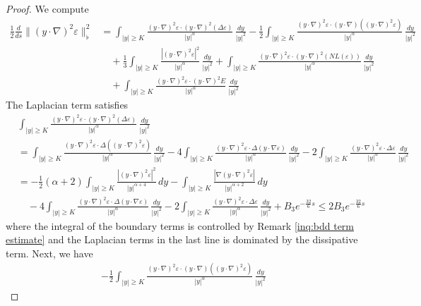 \documentclass[11pt,reqno]{amsart}
\theoremstyle{definition}
\theoremstyle{bfremark}
\numberwithin{equation}{section}
\begin{document}
\begin{proof}
We compute
\begin{align*}
    \frac{1}{2} \frac{d}{ds} \|(y \cdot \nabla)^2 \varepsilon\|_{\flat}^2 
    &= \int_{|y| \geq K} \frac{(y \cdot \nabla)^2 \varepsilon \cdot (y \cdot \nabla)^2(\Delta \varepsilon)}{|y|^{\alpha}}\, \frac{dy}{|y|^2}
    - \frac{1}{2} \int_{|y| \geq K} \frac{(y \cdot \nabla)^2 \varepsilon \cdot (y \cdot \nabla)((y \cdot \nabla)^2\varepsilon)}{|y|^{\alpha}}\,\frac{dy}{|y|^2} \\
    &\quad + \frac{1}{3} \int_{|y| \geq K} \frac{|(y \cdot \nabla)^2\varepsilon|^2}{|y|^{\alpha}}\,\frac{dy}{|y|^2}+ \int_{|y| \geq K} \frac{(y \cdot \nabla)^2 \varepsilon \cdot (y \cdot \nabla)^2 (NL(\varepsilon))}{|y|^{\alpha}}\,\frac{dy}{|y|^2}\\
    & \quad +\int_{|y| \geq K}\frac{(y \cdot \nabla)^2 \varepsilon \cdot (y \cdot \nabla)^2 E}{|y|^{\alpha}}\,\frac{dy}{|y|^2}
\end{align*}
The Laplacian term satisfies
\begin{align*}
    &\int_{|y| \geq K} \frac{(y \cdot \nabla)^2 \varepsilon \cdot (y \cdot \nabla)^2(\Delta \varepsilon)}{|y|^{\alpha}}\,\frac{dy}{|y|^2}\\
    &=\int_{|y| \geq K}\frac{(y \cdot \nabla)^2 \varepsilon \cdot \Delta((y\ \cdot \nabla)^2\varepsilon)}{|y|^{\alpha}}\,\frac{dy}{|y|^2}-4\int_{|y| \geq K}\frac{(y \cdot \nabla)^2\varepsilon \cdot \Delta(y \cdot
     \nabla \varepsilon)}{|y|^{\alpha}}\,\frac{dy}{|y|^2}-2\int_{|y| \geq K}\frac{(y \cdot \nabla)^2 \varepsilon \cdot \Delta \varepsilon}{|y|^{\alpha}}\,\frac{dy}{|y|^2}\\
     & =-\frac{1}{2}(\alpha+2)\int_{|y| \geq K}\frac{|(y \cdot \nabla)^2\varepsilon|^2}{|y|^{\alpha+4}}\,dy-\int_{|y| \geq K}\frac{|\nabla(y \cdot \nabla)^2 \varepsilon|}{|y|^{\alpha+2}}\,dy\\
     & \quad -4\int_{|y| \geq K}\frac{(y \cdot \nabla)^2\varepsilon \cdot \Delta(y \cdot
     \nabla \varepsilon)}{|y|^{\alpha}}\,\frac{dy}{|y|^2}-2\int_{|y| \geq K}\frac{(y \cdot \nabla)^2 \varepsilon \cdot \Delta \varepsilon}{|y|^{\alpha}}\,\frac{dy}{|y|^2}+B_3e^{-\frac{32}{6}s} \leq 2B_3e^{-\frac{32}{6}s}
\end{align*}
where the integral of the boundary terms is controlled by Remark \ref{inq:bdd term estimate} and the Laplacian terms in the last line is dominated by the dissipative term. Next, we have
\begin{align*}
    -\frac{1}{2} \int_{|y| \geq K} \frac{(y \cdot \nabla)^2 \varepsilon \cdot (y \cdot \nabla)((y \cdot \nabla)^2\varepsilon)}{|y|^{\alpha}}\,\frac{dy}{|y|^2} 

\end{align*}
\end{proof}
\end{document}
